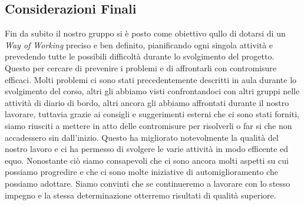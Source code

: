 \documentclass{article}
\begin{document}
\subsection{Considerazioni Finali}
Fin da subito il nostro gruppo si è posto come obiettivo qullo di dotarsi di un \textit{Way of Working} preciso e ben definito, pianificando ogni singola attività e prevedendo tutte le possibili difficoltà durante lo svolgimento del progetto.
Questo per cercare di prevenire i problemi e di affrontarli con contromisure efficaci. Molti problemi ci sono stati precedentemente descritti in aula durante lo svolgimento del corso, altri gli abbiamo visti confrontandoci con altri gruppi nelle attività di diario di bordo,
altri ancora gli abbiamo affrontati durante il nostro lavorare, tuttavia grazie ai consigli e suggerimenti esterni che ci sono stati forniti, siamo riusciti a mettere in atto delle contromisure per risolverli o far si che non accadessero sin dall'inizio.
Questo ha migliorato notevolmente la qualità del nostro lavoro e ci ha permesso di svolgere le varie attività in modo efficente ed equo. Nonostante ciò siamo consapevoli che ci sono ancora molti aspetti su cui possiamo progredire e che ci sono molte iniziative di automiglioramento che possiamo adottare.
Siamo convinti che se continueremo a lavorare con lo stesso impegno e la stessa determinazione otterremo risultati di qualità superiore.
\end{document}
